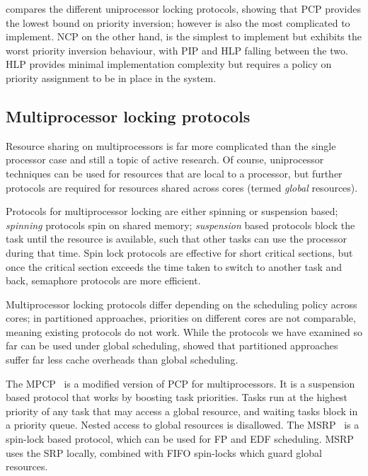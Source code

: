  compares the different uniprocessor locking protocols, showing that \gls{PCP}
provides the lowest bound on priority inversion; however is also the most complicated to implement.
\gls{NCP} on the other hand, is the simplest to implement but exhibits the worst priority inversion
behaviour, with \gls{PIP} and \gls{HLP} falling between the two.  \gls{HLP} provides minimal
implementation complexity but requires a policy on priority assignment to be in place in the system.

\subsection{Multiprocessor locking protocols}

Resource sharing on multiprocessors is far more complicated than the single processor case and still
a topic of active research. Of course, uniprocessor techniques can be used for resources that are
local to a processor, but further protocols are required for resources shared across cores (termed
\emph{global} resources).

Protocols for multiprocessor locking are either spinning or suspension
based; \emph{spinning} protocols spin on shared memory; \emph{suspension} based protocols block the
task until the resource is available, such that other tasks can use the processor during that time.
Spin lock protocols are effective for short critical sections, but once the critical section exceeds
the time taken to switch to another task and back, semaphore protocols are more efficient. 

Multiprocessor locking protocols differ depending on the scheduling policy across cores; in
partitioned approaches, priorities on different cores are not comparable, meaning existing protocols
do not work. While the protocols we have examined so far can be used under global scheduling,
\citet{Brandenburg:phd} showed that partitioned approaches suffer far less cache overheads than
global scheduling. 

The \gls{MPCP}~\citep{Rajkumar_90} is a modified version of \gls{PCP} for multiprocessors. It is a
suspension based protocol that works by boosting task priorities. Tasks run at the highest priority
of any task that may access a global resource, and waiting tasks block in a priority queue. Nested
access to global resources is disallowed. The \gls{MSRP}~\citep{Gai_DL_03} is a spin-lock based
protocol, which can be used for \gls{FP} and \gls{EDF} scheduling. \gls{MSRP} uses the \gls{SRP} locally,
combined with \gls{FIFO} spin-locks which guard global resources. 

